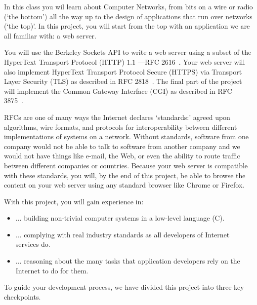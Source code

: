 In this class you wil learn about Computer Networks, from bits on a wire or radio (`the bottom') all the way up to the design of applications that run over networks (`the top)'. 
In this project, you will start from the top with an application we are all familiar with: a web server.

You will use the Berkeley Sockets API to write a web
server using a subset of the HyperText Transport Protocol (HTTP) $1.1$ ---RFC 2616~\cite{httprfc}.  Your web server will also implement
HyperText Transport Protocol Secure (HTTPS) via Transport Layer Security (TLS)
as described in RFC 2818~\cite{httpsrfc}.  The final part of the project will
implement the Common Gateway Interface (CGI) as described in RFC
3875~\cite{cgirfc}.  

RFCs are one of many ways the Internet declares `standards:' agreed upon algorithms, wire formats, and protocols for interoperability between different implementations of systems on a network.
Without standards, software from one company would not be able to talk to software from another company and we would not have things like e-mail, the Web, or even the ability to route traffic between different companies or countries.
Because your web server is compatible with these standards, you will, by the end of this project, be able to browse the content on your web server using any standard browser like Chrome or Firefox.
 
\vspace{5pt}

\noindent With this project, you will gain experience in:
\begin{itemize}
  \item ... building non-trivial computer systems in a low-level language (C).
  \item ... complying with real industry standards as all developers of Internet services do.
  \item ... reasoning about the many tasks that application developers rely on the Internet to do for them.
\end{itemize}

To guide your development process, we have divided this project into three key checkpoints.
